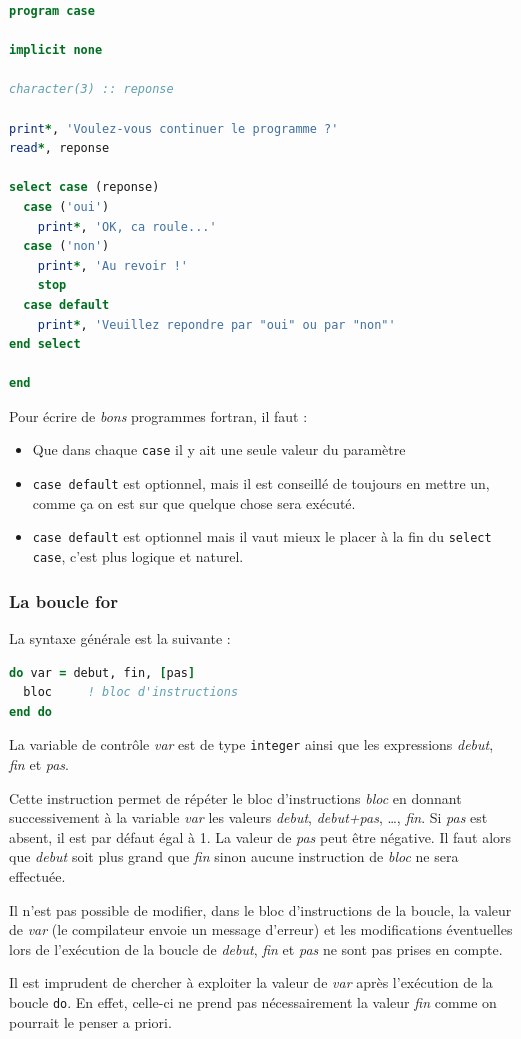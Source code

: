 \documentclass[a4paper,twoside]{article}
\begin{document}
\begin{lstlisting}[language=Fortran]
program case

implicit none

character(3) :: reponse

print*, 'Voulez-vous continuer le programme ?'
read*, reponse

select case (reponse)
  case ('oui')
    print*, 'OK, ca roule...'
  case ('non')
    print*, 'Au revoir !'
    stop
  case default
    print*, 'Veuillez repondre par "oui" ou par "non"'
end select

end
\end{lstlisting}

\begin{remarque}
Pour écrire de \emph{bons} programmes fortran, il faut : 
\begin{itemize}
\item Que dans chaque \texttt{case} il y ait une seule valeur du paramètre
\item \texttt{case default} est optionnel, mais il est conseillé de toujours en mettre un, comme ça on est sur que quelque chose sera exécuté.
\item \texttt{case default} est optionnel mais il vaut mieux le placer à la fin du \texttt{select case}, c'est plus logique et naturel.
\end{itemize}
\end{remarque}

\subsubsection{La boucle for}
La syntaxe générale est la suivante :
\begin{lstlisting}[language=Fortran]
do var = debut, fin, [pas] 
  bloc     ! bloc d'instructions 
end do
\end{lstlisting}

La variable de contrôle \emph{var} est de type \texttt{integer} ainsi que les expressions \emph{debut}, \emph{fin} et \emph{pas}.

Cette instruction permet de répéter le bloc d'instructions \emph{bloc} en donnant successivement à la variable \emph{var} les valeurs \emph{debut}, \emph{debut+pas}, \ldots, \emph{fin}. Si \emph{pas} est absent, il est par défaut égal à 1. La valeur de \emph{pas} peut être négative. Il faut alors que \emph{debut} soit plus grand que \emph{fin} sinon aucune instruction de \emph{bloc} ne sera effectuée. 

\begin{attention}
Il n'est pas possible de modifier, dans le bloc d'instructions de la boucle, la valeur de \emph{var} (le compilateur envoie un message d'erreur) et les modifications éventuelles lors de l'exécution de la boucle de \emph{debut}, \emph{fin} et \emph{pas} ne sont pas prises en compte. 

Il est imprudent de chercher à exploiter la valeur de \emph{var} après l'exécution de la boucle \texttt{do}. En effet, celle-ci ne prend pas nécessairement la valeur \emph{fin} comme on pourrait le penser a priori.
\end{attention}
\end{document}
